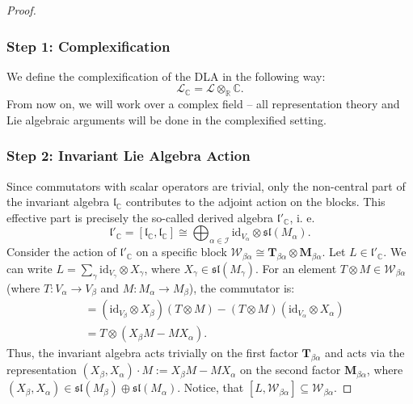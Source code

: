\documentclass[10pt,twocolumn,superscriptaddress,aps,amsmath,amssymb,citeautoscript,floatfix,prx]{revtex4-2}
\newcounter{alg}
\theoremstyle{plain}
\theoremstyle{plain}
\theoremstyle{plain}
\theoremstyle{plain}
\theoremstyle{plain}
\theoremstyle{plain}
\newcommand{\C}{\mathbb{C}}
\newcommand{\id}{\mathrm{id}}
\theoremstyle{plain}
\theoremstyle{definition}
\theoremstyle{plain}
\begin{document}
\begin{appendix}
\begin{proof}
\subsubsection*{Step 1: Complexification}

We define the complexification of the DLA in the following way:
\begin{equation}\label{eq:complexified_DLA_with_breakers}
    \mathcal{L}_{\mathbb{C}}=\mathcal{L} \otimes_{\mathbb{R}} \mathbb{C}.
\end{equation}
From now on, we will work over a complex field -- all representation theory and Lie algebraic arguments will be done in the complexified setting.

\subsubsection*{Step 2: Invariant Lie Algebra Action}

Since commutators with scalar operators are trivial, only the non-central part of the invariant algebra $\mathfrak{l}_\C$ contributes to the adjoint action on the blocks. 
This effective part is precisely the so-called derived algebra 
$\mathfrak{l}'_\C$, i. e.
\[
    \mathfrak{l}'_\C = [\mathfrak{l}_\C, \mathfrak{l}_\C] \cong \bigoplus_{\alpha \in \mathcal{I}} \mathrm{id}_{V_\alpha} \otimes \mathfrak{sl}\left(M_\alpha\right).
\]
Consider the action of $\mathfrak{l}'_\C$ on a specific block $\mathcal{W}_{\beta\alpha} \cong \mathbf{T}_{\beta\alpha} \otimes \mathbf{M}_{\beta\alpha}$.
Let $L \in \mathfrak{l}'_\C$. We can write $L = \sum_\gamma \id_{V_\gamma} \otimes X_\gamma$, where $X_\gamma \in \mathfrak{sl}(M_\gamma)$.
For an element $T \otimes M \in \mathcal{W}_{\beta\alpha}$ (where $T: V_\alpha \to V_\beta$ and $M: M_\alpha \rightarrow M_\beta$), the commutator is:
\begin{align*}
    [L, T \otimes M] &= (\id_{V_\beta} \otimes X_\beta)(T \otimes M) - (T \otimes M)(\id_{V_\alpha} \otimes X_\alpha) \nonumber \\
    &= T \otimes (X_\beta M - M X_\alpha).
\end{align*}
Thus, the invariant algebra acts trivially on the first factor $\mathbf{T}_{\beta\alpha}$ and acts via the representation $(X_\beta, X_\alpha) \cdot M := X_\beta M - M X_\alpha$
on the second factor $\mathbf{M}_{\beta\alpha}$, where
$(X_\beta, X_\alpha) \in \mathfrak{sl}\left(M_\beta\right) \oplus \mathfrak{sl}\left(M_\alpha\right)$.
Notice, that $\left[L, \mathcal{W}_{\beta \alpha}\right] \subseteq \mathcal{W}_{\beta \alpha}$.


\end{proof}
\end{appendix}
\end{document}
